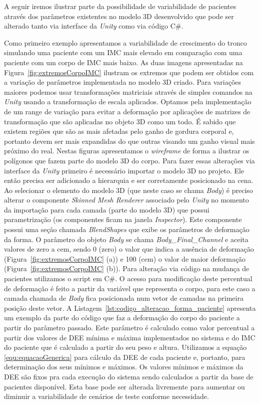 A seguir iremos ilustrar parte da possibilidade de variabilidade de pacientes através dos parâmetros existentes no modelo 3D desenvolvido que pode ser alterado tanto via interface da \textit{Unity} como via código C\#. 

Como primeiro exemplo apresentamos a variabilidade de crescimento do tronco simulando uma paciente com um \acrshort{IMC} mais elevado em comparação com uma paciente com um corpo de \acrshort{IMC} mais baixo. As duas imagens apresentadas na Figura~\ref{fig:extremosCorpoIMC} ilustram os extremos que podem ser obtidos com a variação de parâmetros implementada no modelo 3D criado. Para variações maiores podemos usar transformações matriciais através de simples comandos na \textit{Unity} usando a transformação de escala aplicados. Optamos pela implementação de um range de variação para evitar a deformação por aplicações de matrizes de transformação que são aplicadas no objeto 3D como um todo. É sabido que existem regiões que são as mais afetadas pelo ganho de gordura corporal e, portanto devem ser mais expandidas do que outras visando um ganho visual mais próximo do real. Nestas figuras apresentamos o \textit{wireframe} de forma a ilustrar os polígonos que fazem parte do modelo 3D do corpo. Para fazer essas alterações via interface da \textit{Unity} primeiro é necessário importar o modelo 3D no projeto. Ele então precisa ser adicionado a hierarquia e ser corretamente posicionado na cena. Ao selecionar o elemento do modelo 3D (que neste caso se chama \textit{Body}) é preciso alterar o componente \textit{Skinned Mesh Renderer} associado pelo \textit{Unity} no momento da importação para cada camada (parte do modelo 3D) que possui parametrização (os componentes ficam na janela \textit{Inspector}). Este componente possui uma seção chamada \textit{BlendShapes} que exibe os parâmetros de deformação da forma. O parâmetro do objeto \textit{Body} se chama \textit{Body\_Final\_Channel} e aceita valores de zero a cem, sendo 0 (zero) o valor que indica a ausência de deformação (Figura~\ref{fig:extremosCorpoIMC} (a)) e 100 (cem) o valor de maior deformação (Figura~\ref{fig:extremosCorpoIMC} (b)). Para alteração via código na mudança de pacientes utilizamos o script em C\#. O acesso para modificação deste percentual de deformação é feito a partir da variável que representa o corpo, para este caso a camada chamada de \textit{Body} fica posicionada num vetor de camadas na primeira posição deste vetor. A Listagem~\ref{lst:codigo_alteracao_forma_paciente} apresenta um exemplo da parte do código que faz a deformação do corpo do paciente a partir do parâmetro passado. Este parâmetro é calculado como valor percentual a partir dos valores de \acrshort{DEE} mínima e máxima implementados no sistema e do \acrshort{IMC} do paciente que é calculado a partir do seu peso e altura. Utilizamos a equação \ref{equ:equacaoGenerica} para cálculo da \acrshort{DEE} de cada paciente e, portanto, para determinação dos seus mínimos e máximos. Os valores mínimos e máximos da \acrshort{DEE} são fixos pra cada execução do sistema sendo calculados a partir da base de pacientes disponível. Esta base pode ser alterada livremente para aumentar ou diminuir a variabilidade de cenários de teste conforme necessidade.

